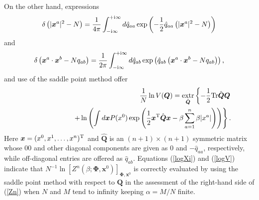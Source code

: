 \documentclass[12pt]{iopart}
\newcommand{\vm}[1]{\boldsymbol{#1}}
\begin{document}
On the other hand, expressions 
\begin{eqnarray}
\delta\left (|\vm{x}^a|^2-N \right )
=\frac{1}{4 \pi} \int_{-{\rm i}\infty}^{+{\rm i}\infty}
d \hat{q}_{aa} \exp \left (-\frac{1}{2} \hat{q}_{aa} 
\left (|\vm{x}^a|^2-N \right ) \right )
\end{eqnarray}
and 
\begin{eqnarray}
\delta\left (\vm{x}^a \cdot \vm{x}^b -N q_{ab}\right )
=\frac{1}{2 \pi} \int_{-{\rm i}\infty}^{+{\rm i}\infty}
d \hat{q}_{ab} \exp \left ( \hat{q}_{ab} 
\left (\vm{x}^a \cdot \vm{x}^b-N q_{ab} \right ) \right ), 
\end{eqnarray}
and use of the saddle point method offer 
\begin{eqnarray}
&&\frac{1}{N} \ln V(\vm{Q})
=\mathop{\rm extr}_{\hat{\vm{Q}}}
\left \{
-\frac{1}{2} {\rm Tr} \hat{\vm{Q}}\vm{Q} \right . \cr
&& \hspace*{2cm}
\left . + \ln 
\left (
\int d\vm{x} 
P(x^0) \exp \left (\frac{1}{2} 
\vm{x}^{\rm T} \hat{\vm{Q} }\vm{x}-\beta \sum_{a=1}^n \beta |x^a| \right )
\right ) 
\right \}.  
\label{logV}
\end{eqnarray}
Here $\vm{x}=(x^0,x^1,\ldots,x^n)^{\rm T}$ and $\hat{\vm{Q}}$ is an $(n+1)\times (n+1)$ symmetric matrix whose $00$ and other diagonal components are given as $0$ and $-\hat{q}_{aa}$, respectively, while off-diagonal entries are offered as $\hat{q}_{ab}$. Equations (\ref{logXi}) and (\ref{logV}) indicate that $N^{-1} \ln \left [Z^n (\beta;\vm{\Phi}, \vm{x}^0 ) \right]_{\vm{\Phi}, \vm{x}^0}$ is correctly evaluated by using the saddle point method with respect to $\vm{Q}$ in the assessment of the right-hand side of (\ref{Zn}) when $N$ and $M$ tend to infinity keeping $\alpha=M/N$ finite. 
\end{document}
